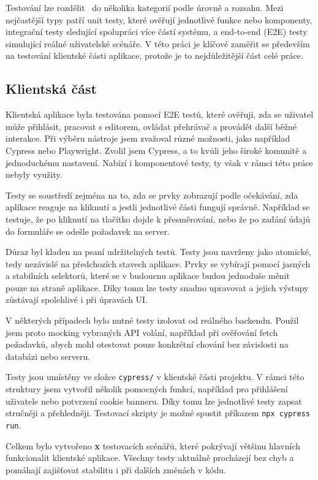 Testování lze rozdělit~\cite{meszaros_2007} do několika kategorií podle úrovně a rozsahu. 
Mezi nejčastější typy patří unit testy, které ověřují jednotlivé funkce nebo komponenty, integrační testy sledující spolupráci více částí systému, a end-to-end (E2E) testy simulující reálné uživatelské scénáře. 
V této práci je klíčové zaměřit se především na testování klientské části aplikace, protože je to nejdůležitější část celé práce.

\subsection{Klientská část}

Klientská aplikace byla testována pomocí E2E testů, které ověřují, zda se uživatel může přihlásit, pracovat s editorem, ovládat přehrávač a provádět další běžné interakce. 
Při výběru nástroje jsem zvažoval různé možnosti, jako například Cypress nebo Playwright. 
Zvolil jsem Cypress, a to kvůli jeho široké komunitě a jednoduchému nastavení.
Nabízí i komponentové testy, ty však v rámci této práce nebyly využity.

Testy se soustředí zejména na to, zda se prvky zobrazují podle očekávání, zda aplikace reaguje na kliknutí a jestli jednotlivé části fungují správně.
Například se testuje, že po kliknutí na tlačítko dojde k přesměrování, nebo že po zadání údajů do formuláře se odešle požadavek na server.

Důraz byl kladen na psaní udržitelných testů. 
Testy jsou navrženy jako atomické, tedy nezávislé na předchozích stavech aplikace. 
Prvky se vybírají pomocí jasných a stabilních selektorů, které se v budoucnu aplikace budou jednoduše měnit pouze na straně aplikace.
Díky tomu lze testy snadno upravovat a jejich výstupy zůstávají spolehlivé i při úpravách UI.

V některých případech bylo nutné testy izolovat od reálného backendu.
Použil jsem proto mocking vybraných API volání, například při ověřování fetch požadavků, abych mohl otestovat pouze konkrétní chování bez závislosti na databázi nebo serveru.

Testy jsou umístěny ve složce \texttt{cypress/} v klientské části projektu. 
V rámci této struktury jsem vytvořil několik pomocných funkcí, například pro přihlášení uživatele nebo potvrzení cookie banneru. 
Díky tomu lze jednotlivé testy zapsat stručněji a přehledněji.
Testovací skripty je možné spustit příkazem \verb|npx cypress run|.

Celkem bylo vytvořeno \textbf{x} testovacích scénářů, které pokrývají většinu hlavních funkcionalit klientské aplikace. 
Všechny testy aktuálně procházejí bez chyb a pomáhají zajišťovat stabilitu i při dalších změnách v kódu.

